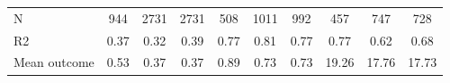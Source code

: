 \begin{tabular}{lccc|ccc|ccc}
N           &         944         &        2731         &        2731         &         508         &        1011         &         992         &         457         &         747         &         728         \\
R2          &        0.37         &        0.32         &        0.39         &        0.77         &        0.81         &        0.77         &        0.77         &        0.62         &        0.68         \\
Mean outcome&        0.53         &        0.37         &        0.37         &        0.89         &        0.73         &        0.73         &       19.26         &       17.76         &       17.73         \\
\bottomrule \end{tabular}
